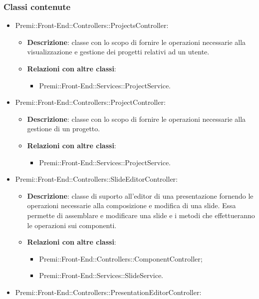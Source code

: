 \subsubsection*{Classi contenute}
\begin{itemize}

	\item Premi::Front-End::Controllers::ProjectsController:
	\begin{itemize}
		\item \textbf{Descrizione}: classe con lo scopo di fornire le operazioni necessarie alla visualizzazione e gestione dei progetti relativi ad un utente.
		\item \textbf{Relazioni con altre classi}:
		\begin{itemize}
			\item Premi::Front-End::Services::ProjectService.
		\end{itemize}
	\end{itemize}
	\item  Premi::Front-End::Controllers::ProjectController:
	\begin{itemize}
		\item \textbf{Descrizione}: classe con lo scopo di fornire le operazioni necessarie alla gestione di un progetto.
		\item \textbf{Relazioni con altre classi}:
		\begin{itemize}
			\item Premi::Front-End::Services::ProjectService.
		\end{itemize}
	\end{itemize}
	\item  Premi::Front-End::Controllers::SlideEditorController:
	\begin{itemize}
		\item \textbf{Descrizione}: classe di suporto all'editor di una presentazione fornendo le operazioni necessarie alla composizione e modifica di una slide. Essa permette di assemblare e modificare una \gls{slide} e i metodi che effettueranno le operazioni sui componenti.
		\item \textbf{Relazioni con altre classi}:
		\begin{itemize}
			\item Premi::Front-End::Controllers::ComponentController;
			\item Premi::Front-End::Services::SlideService.
		\end{itemize}
	\end{itemize}
	\item  Premi::Front-End::Controllers::PresentationEditorController:

\end{itemize}
